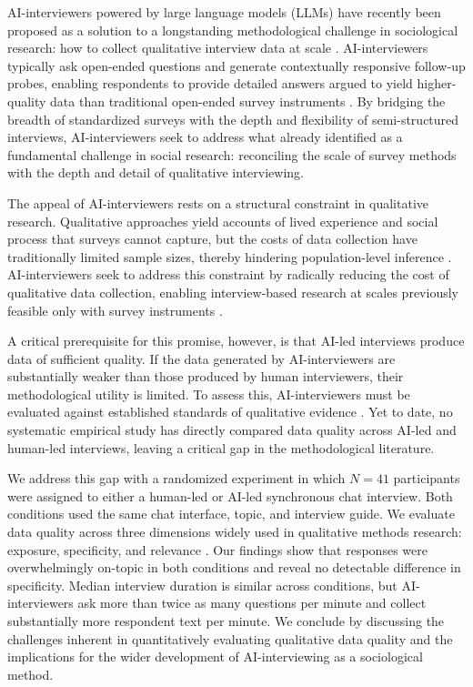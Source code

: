 \documentclass[12pt]{article}
\newcommand{\AIIs}{AI-interviewers}
\begin{document}
\AIIs{} powered by large language models (LLMs) have recently been proposed as a solution to a longstanding methodological challenge in sociological research: how to collect qualitative interview data at scale \citep{Chopra2023, geiecke_conversations_2024, Wuttke2024, jacobsen_chatbots_2025}. \AIIs{} typically ask open-ended questions and generate contextually responsive follow-up probes, enabling respondents to provide detailed answers argued to yield higher-quality data than traditional open-ended survey instruments \citep{geiecke_conversations_2024}. By bridging the breadth of standardized surveys with the depth and flexibility of semi-structured interviews, \AIIs{} seek to address what \citet{lazarsfeld_controversy_1944} already identified as a fundamental challenge in social research: reconciling the scale of survey methods with the depth and detail of qualitative interviewing.

The appeal of \AIIs{} rests on a structural constraint in qualitative research. Qualitative approaches yield accounts of lived experience and social process that surveys cannot capture, but the costs of data collection have traditionally limited sample sizes, thereby hindering population-level inference \citep{small_how_2009, Goldthorpe2000, Weiss1995}. \AIIs{} seek to address this constraint by radically reducing the cost of qualitative data collection, enabling interview-based research at scales previously feasible only with survey instruments \citep{geiecke_conversations_2024, Wuttke2024}.

A critical prerequisite for this promise, however, is that AI-led interviews produce data of sufficient quality. If the data generated by \AIIs{} are substantially weaker than those produced by human interviewers, their methodological utility is limited. To assess this, \AIIs{} must be evaluated against established standards of qualitative evidence \citep{SmallCalarco2022}. Yet to date, no systematic empirical study has directly compared data quality across AI-led and human-led interviews, leaving a critical gap in the methodological literature.

We address this gap with a randomized experiment in which $N = 41$ participants were assigned to either a human-led or AI-led synchronous chat interview. Both conditions used the same chat interface, topic, and interview guide. We evaluate data quality across three dimensions widely used in qualitative methods research: exposure, specificity, and relevance \citep{SmallCalarco2022, Weiss1995, Lareau2021}. Our findings show that responses were overwhelmingly on-topic in both conditions and reveal no detectable difference in specificity. Median interview duration is similar across conditions, but \AIIs{} ask more than twice as many questions per minute and collect substantially more respondent text per minute. We conclude by discussing the challenges inherent in quantitatively evaluating qualitative data quality and the implications for the wider development of AI-interviewing as a sociological method.
\end{document}
